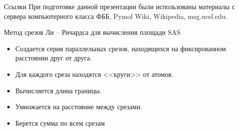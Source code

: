\documentclass{beamer}
\begin{document}
    \begin{frame}{Ссылки}
        При подготовке данной презентации были использованы материалы с
        сервера компьютерного класса ФББ, Pymol Wiki, Wikipedia, msg.ucsf.edu.
    \end{frame}

    \begin{frame}{Метод срезов Ли -- Ричардса
        для вычисления площади SAS}
        \begin{itemize}
        \item Создается серия параллельных срезов,
            находящихся на фиксированном расстоянии друг от друга.
        \item Для каждого среза находятся <<круги>> от атомов.
        \item Вычисляется длина границы.
        \item Умножается на расстояние между срезами.
        \item Берется сумма по всем срезам
        \end{itemize}
    \end{frame}
\end{document}
